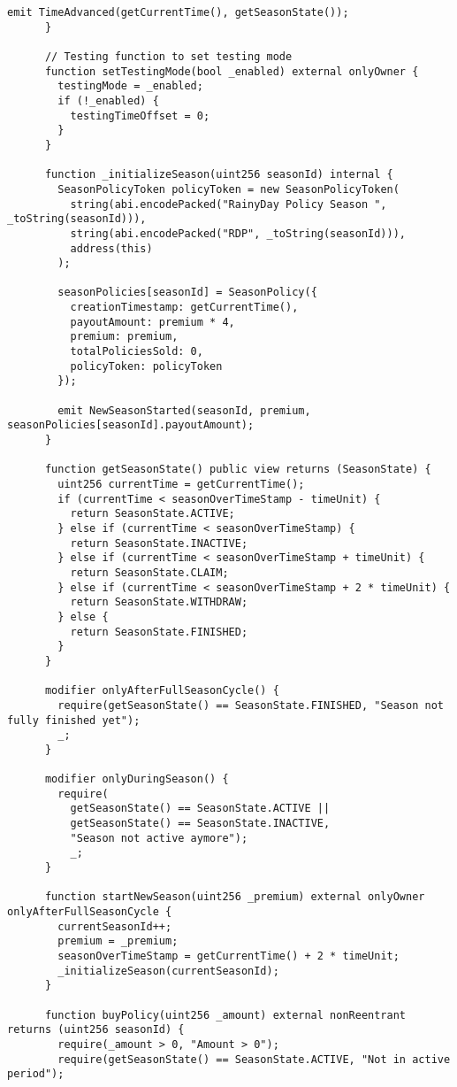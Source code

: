 \begin{lstlisting}[style=soliditystyle, caption={RainyDayFund.sol - Main Insurance Contract},label={lst:lstlistingA}]
        emit TimeAdvanced(getCurrentTime(), getSeasonState());
      }

      // Testing function to set testing mode
      function setTestingMode(bool _enabled) external onlyOwner {
        testingMode = _enabled;
        if (!_enabled) {
          testingTimeOffset = 0;
        }
      }

      function _initializeSeason(uint256 seasonId) internal {
        SeasonPolicyToken policyToken = new SeasonPolicyToken(
          string(abi.encodePacked("RainyDay Policy Season ", _toString(seasonId))),
          string(abi.encodePacked("RDP", _toString(seasonId))),
          address(this)
        );

        seasonPolicies[seasonId] = SeasonPolicy({
          creationTimestamp: getCurrentTime(),
          payoutAmount: premium * 4,
          premium: premium,
          totalPoliciesSold: 0,
          policyToken: policyToken
        });

        emit NewSeasonStarted(seasonId, premium, seasonPolicies[seasonId].payoutAmount);
      }

      function getSeasonState() public view returns (SeasonState) {
        uint256 currentTime = getCurrentTime();
        if (currentTime < seasonOverTimeStamp - timeUnit) {
          return SeasonState.ACTIVE;
        } else if (currentTime < seasonOverTimeStamp) {
          return SeasonState.INACTIVE;
        } else if (currentTime < seasonOverTimeStamp + timeUnit) {
          return SeasonState.CLAIM;
        } else if (currentTime < seasonOverTimeStamp + 2 * timeUnit) {
          return SeasonState.WITHDRAW;
        } else {
          return SeasonState.FINISHED;
        }
      }

      modifier onlyAfterFullSeasonCycle() {
        require(getSeasonState() == SeasonState.FINISHED, "Season not fully finished yet");
        _;
      }

      modifier onlyDuringSeason() {
        require(
          getSeasonState() == SeasonState.ACTIVE ||
          getSeasonState() == SeasonState.INACTIVE,
          "Season not active aymore");
          _;
      }

      function startNewSeason(uint256 _premium) external onlyOwner onlyAfterFullSeasonCycle {
        currentSeasonId++;
        premium = _premium;
        seasonOverTimeStamp = getCurrentTime() + 2 * timeUnit;
        _initializeSeason(currentSeasonId);
      }

      function buyPolicy(uint256 _amount) external nonReentrant returns (uint256 seasonId) {
        require(_amount > 0, "Amount > 0");
        require(getSeasonState() == SeasonState.ACTIVE, "Not in active period");


\end{lstlisting}
